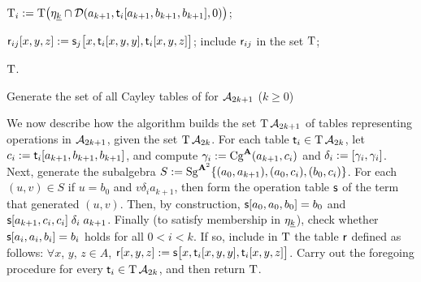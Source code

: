   \begin{algorithm}


     {

      $\operatorname{T}_i := \operatorname{T} \bigl(\eta_{\underline{k}} \cap \mathcal{D} (a_{k+1}, \mathsf{t}_i[a_{k+1}, b_{k+1}, b_{k+1}], 0)\bigr)$;

       {
          {
          $\mathsf{r}_{ij}[x,y,z] :=  \mathsf{s}_j\bigl[x, \mathsf{t}_i[x,y,y], \mathsf{t}_i[x,y,z]\bigr]$;
        }
        include $\mathsf{r}_{ij}$ in the set $\operatorname{T}$;
      }
    }

    \Return $\operatorname{T}$. %
    \caption{Generate the set of all Cayley tables of \ldtos for $\mathcal{A}_{2k+1}$ \label{alg:stream-ldt1} {\small ($k\geq 0$)}}
  \end{algorithm}

  We now describe how the algorithm builds the set
  $\operatorname{T} \mathcal{A}_{2k+1}$ of tables representing operations in $\mathcal{A}_{2k+1}$, given the set
  $\operatorname{T} \mathcal{A}_{2k}$.
  For each table $\mathsf{t}_i \in \operatorname{T} \mathcal{A}_{2k}$,
  let $c_i:= \mathsf{t}_i[a_{k+1}, b_{k+1}, b_{k+1}]$, and compute
  $\gamma_i := \operatorname{Cg}^{\mathbf{A}}(a_{k+1}, c_i)$ and $\delta_i := [\gamma_i, \gamma_i]$. %
  Next, generate the subalgebra $S:=\operatorname{Sg}^{\mathbf{A}^2}\{(a_0,a_{k+1}), (a_0,c_i), (b_0,c_i)\}$.
  For each $(u,v) \in S$ if $u=b_0$ and $v \mathrel{\delta_i} a_{k+1}$, then
  form the operation table $\mathsf{s}$ of the term that generated $(u,v)$.
  Then, by construction, $\mathsf{s}[a_0, a_0, b_0] = b_0$ and
  $\mathsf{s}[a_{k+1},c_i,c_i] \mathrel{\delta_i} a_{k+1}$.
  Finally (to satisfy membership in $\eta_{\underline{k}}$),
  check whether $\mathsf{s}[a_i, a_i, b_i] = b_i$ holds for all $0< i< k$.
  If so, include in $\operatorname{T}$ the table $\mathsf{r}$ defined as follows:
  $\forall x$, $y$, $z \in A$,
    $\mathsf{r}[x,y,z] :=  \mathsf{s}\bigl[x, \mathsf{t}_i[x,y,y], \mathsf{t}_i[x,y,z]\bigr]$.
  Carry out the foregoing procedure for every $\mathsf{t}_i \in \operatorname{T} \mathcal{A}_{2k}$,
  and then return $\operatorname{T}$.


